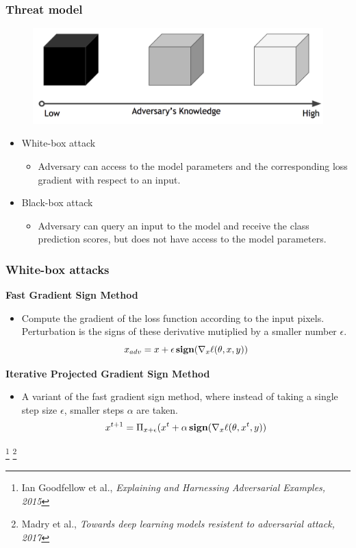 \documentclass[10pt,mathserif]{beamer}
\begin{document}
\begin{frame}
\frametitle{Threat model}
\begin{figure}
    \centering
    \includegraphics[scale=0.15]{figures/threat_model.png}
    \label{fig:adversarial_attack}
\end{figure}\pause
\begin{itemize}\itemsep=12pt
    \item White-box attack
    \begin{itemize}
        \item Adversary can access to the model parameters and the corresponding loss gradient with respect to an input.
    \end{itemize}\pause
    \item Black-box attack
    \begin{itemize}
        \item Adversary can query an input to the model and receive the class prediction scores, but does not have access to the model parameters.
    \end{itemize}
\end{itemize}
\end{frame}
 

\begin{frame}
\frametitle{White-box attacks}
\textbf{Fast Gradient Sign Method}
\vspace{0.5em}
\begin{itemize}
    \item Compute the gradient of the loss function according to the input pixels. Perturbation is the signs of these derivative mutiplied by a smaller number $\epsilon$.
    \[x_{adv} = x + \epsilon \mathop{\bf sign} (\nabla_x \ell(\theta, x, y))\]
\end{itemize}\pause

\vspace{1em}
    
\textbf{Iterative Projected Gradient Sign Method}
\vspace{0.5em}
\begin{itemize}
    \item A variant of the fast gradient sign method, where instead of taking a single step size $\epsilon$, smaller steps $\alpha$ are taken.
    \[x^{t+1} = \Pi_{x+\epsilon}(x^t+\alpha \mathop{\bf sign} (\nabla_x \ell(\theta, x^t, y))\]
\end{itemize}

\footnote{\scriptsize Ian Goodfellow et al., \textit{Explaining and Harnessing Adversarial Examples, 2015}}
\footnote{\scriptsize Madry et al., \textit{Towards deep learning models resistent to adversarial attack, 2017}}
\end{frame}
\end{document}
